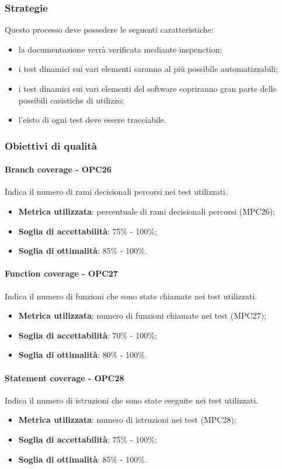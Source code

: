 \documentclass[PianoDiQualifica.tex]{subfiles}
\begin{document}
		\subsubsection{Strategie}
			Questo processo deve possedere le seguenti caratteristiche:
			\begin{itemize}
				\item la documentazione verrà verificata mediante inspenction;
				\item i test dinamici sui vari elementi saranno al più possibile automatizzabili;
				\item i test dinamici sui vari elementi del software copriranno gran parte delle possibili casistiche di utilizzo;
				\item l'eisto di ogni test deve essere tracciabile.
			\end{itemize}
		
		\subsubsection{Obiettivi di qualità}
			\paragraph{Branch coverage - OPC26}
				Indica il numero di rami decisionali percorsi nei test utilizzati.
				\begin{itemize}
					\item \textbf{Metrica utilizzata}: percentuale di rami decisionali percorsi (MPC26);
					\item \textbf{Soglia di accettabilità}: 75\% - 100\%;
					\item \textbf{Soglia di ottimalità}: 85\% - 100\%.
				\end{itemize}
			
			\paragraph{Function coverage - OPC27}
				Indica il numero di funzioni che sono state chiamate nei test utilizzati.
				\begin{itemize}
					\item \textbf{Metrica utilizzata}: numero di funzioni chiamate nei test (MPC27);
					\item \textbf{Soglia di accettabilità}: 70\% - 100\%;
					\item \textbf{Soglia di ottimalità}: 80\% - 100\%.
				\end{itemize}
				
			\paragraph{Statement coverage - OPC28}
				Indica il numero di istruzioni che sono state eseguite nei test utilizzati.
				\begin{itemize}
					\item \textbf{Metrica utilizzata}: numero di istruzioni nei test (MPC28);
					\item \textbf{Soglia di accettabilità}: 75\% - 100\%;
					\item \textbf{Soglia di ottimalità}: 85\% - 100\%.
				\end{itemize}
\end{document}
